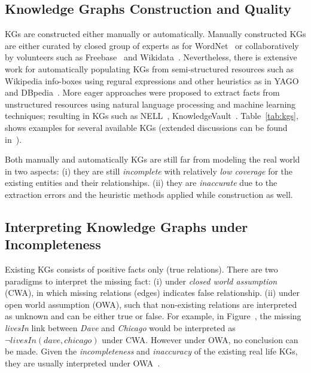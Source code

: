 
\subsection{Knowledge Graphs Construction and Quality}

KGs are constructed either manually or automatically. Manually constructed KGs are either curated by closed group of experts as for WordNet~\cite{wordnet} or collaboratively by volunteers such as \eg Freebase~\cite{Freebase} and Wikidata~\cite{wikidata}.  Nevertheless, there is extensive work for automatically populating KGs from semi-structured resources such as Wikipedia info-boxes using regural expressions and other heuristics as in YAGO~\cite{yago} and DBpedia~\cite{dbpedia}. More eager approaches were proposed to extract facts from unstructured resources using natural language processing and machine learning techniques; resulting in KGs such as  NELL~\cite{nell}, KnowledgeVault~\cite{KnowledgeVault}. Table~\ref{tab:kgs}, shows examples for several available KGs (extended discussions can be found in~\cite{Nickel2015ARO,DBLP:journals/semweb/Paulheim17}). 


Both manually and automatically KGs are still far from modeling the real world in two aspects: (i) they are still \textit{incomplete} with relatively \textit{low coverage} for the existing entities and their relationships. (ii) they are \textit{inaccurate} due to the extraction errors and the heuristic methods applied while construction as well.  



\subsection{Interpreting Knowledge Graphs under Incompleteness}

Existing KGs consists of positive facts only (\ie true relations). There are two paradigms to interpret the missing fact: (i) under \textit{closed world assumption} (CWA), in which missing relations (\ie edges) indicates false relationship. (ii) under open world assumption (OWA), such that non-existing relations are interpreted as unknown and can be either true or false. For example, in Figure~\cite{rdf}, the missing \textit{livesIn} link between \textit{Dave} and \textit{Chicago} would be interpreted as $\neg livesIn(dave, chicago)$ under CWA. However under OWA, no conclusion can be made. Given the \textit{incompleteness} and \textit{inaccuracy} of the existing real life KGs, they are usually interpreted under OWA~\cite{Nickel2015ARO}. 


